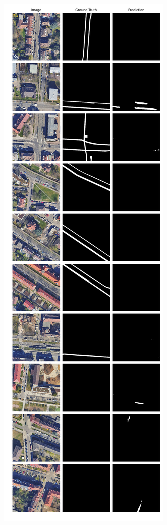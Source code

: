	\begin{figure}
	\centering
	\begin{subfigure}{.4\textwidth}
		\centering
		\includegraphics[width=1.\textwidth]{Bilder/Samples-KA/bunet15-r.png} 

\end{subfigure}
\end{figure}
